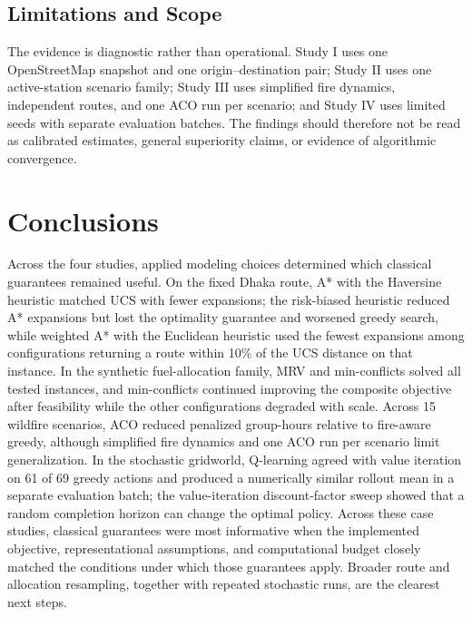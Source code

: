 \documentclass{ai-lab-report}
\begin{document}
\subsection{Limitations and Scope}
The evidence is diagnostic rather than operational. Study I uses one OpenStreetMap snapshot and one origin--destination pair; Study II uses one active-station scenario family; Study III uses simplified fire dynamics, independent routes, and one ACO run per scenario; and Study IV uses limited seeds with separate evaluation batches. The findings should therefore not be read as calibrated estimates, general superiority claims, or evidence of algorithmic convergence.

\section{Conclusions}
Across the four studies, applied modeling choices determined which classical guarantees remained useful. On the fixed Dhaka route, A* with the Haversine heuristic matched UCS with fewer expansions; the risk-biased heuristic reduced A* expansions but lost the optimality guarantee and worsened greedy search, while weighted A* with the Euclidean heuristic used the fewest expansions among configurations returning a route within 10\% of the UCS distance on that instance. In the synthetic fuel-allocation family, MRV and min-conflicts solved all tested instances, and min-conflicts continued improving the composite objective after feasibility while the other configurations degraded with scale. Across 15 wildfire scenarios, ACO reduced penalized group-hours relative to fire-aware greedy, although simplified fire dynamics and one ACO run per scenario limit generalization. In the stochastic gridworld, Q-learning agreed with value iteration on 61 of 69 greedy actions and produced a numerically similar rollout mean in a separate evaluation batch; the value-iteration discount-factor sweep showed that a random completion horizon can change the optimal policy. Across these case studies, classical guarantees were most informative when the implemented objective, representational assumptions, and computational budget closely matched the conditions under which those guarantees apply. Broader route and allocation resampling, together with repeated stochastic runs, are the clearest next steps.




\end{document}
